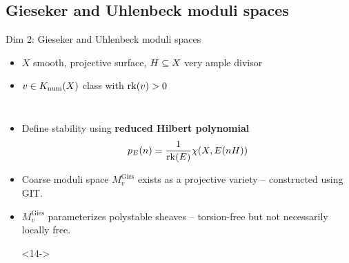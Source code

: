 \documentclass[8pt,handout]{beamer} %
\begin{document}
\subsection{Gieseker and Uhlenbeck moduli spaces}
\begin{frame}[fragile]{Dim 2: Gieseker and Uhlenbeck moduli spaces}
    \begin{itemize}
        \item<2->[] $X$ smooth, projective surface, $H \subseteq X$ very ample divisor
        \item<3->[] $v \in K_{\mathrm{num}}(X)$ class with $\operatorname{\mathrm{rk}}(v) > 0$
        \item[]
    \end{itemize}
    
    \begin{columns}[t]
        \begin{itemize}
            \item<5-> Define stability using \textbf{reduced Hilbert polynomial}
            \[ p_E(n) = \frac{1}{\operatorname{\mathrm{rk}}(E)} \chi(X, E(n H)) \]
            \item<6-> Coarse moduli space $M^{\text{Gies}}_v$ exists as a projective variety -- constructed using GIT.
            \item<7-> $M^{\text{Gies}}_v$ parameterizes polystable sheaves -- torsion-free but not necessarily locally free.
            \item[]
            \item[]<14->
            \begin{center}
            \end{center}
        \end{itemize}
        

\end{columns}
\end{frame}
\end{document}
